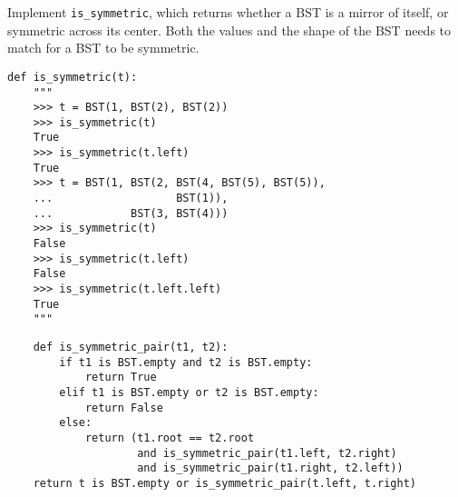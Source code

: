 \begin{blocksection}
\question Implement \lstinline$is_symmetric$, which returns whether a BST
is a mirror of itself, or symmetric across its center. Both the values and the
shape of the BST needs to match for a BST to be symmetric.

\begin{lstlisting}
def is_symmetric(t):
    """
    >>> t = BST(1, BST(2), BST(2))
    >>> is_symmetric(t)
    True
    >>> is_symmetric(t.left)
    True
    >>> t = BST(1, BST(2, BST(4, BST(5), BST(5)),
    ...                   BST(1)),
    ...            BST(3, BST(4)))
    >>> is_symmetric(t)
    False
    >>> is_symmetric(t.left)
    False
    >>> is_symmetric(t.left.left)
    True
    """
\end{lstlisting}

\begin{solution}[2in]
\begin{lstlisting}
    def is_symmetric_pair(t1, t2):
        if t1 is BST.empty and t2 is BST.empty:
            return True
        elif t1 is BST.empty or t2 is BST.empty:
            return False
        else:
            return (t1.root == t2.root
                    and is_symmetric_pair(t1.left, t2.right)
                    and is_symmetric_pair(t1.right, t2.left))
    return t is BST.empty or is_symmetric_pair(t.left, t.right)
\end{lstlisting}
\end{solution}
\end{blocksection}
